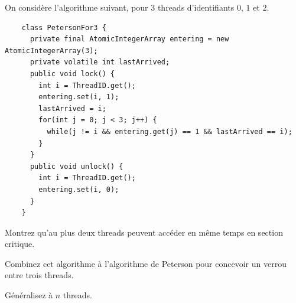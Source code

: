 
\begingroup

\begin{exercice}
  \label{exo:locks/filter}

  On considère l'algorithme suivant, pour $3$ threads d'identifiants $0$, $1$ et $2$. 

  \begin{lstlisting}
    class PetersonFor3 {
      private final AtomicIntegerArray entering = new AtomicIntegerArray(3);
      private volatile int lastArrived;
      public void lock() {
        int i = ThreadID.get();
        entering.set(i, 1);
        lastArrived = i;
        for(int j = 0; j < 3; j++) {
          while(j != i && entering.get(j) == 1 && lastArrived == i);
        }
      }
      public void unlock() {
        int i = ThreadID.get();
        entering.set(i, 0);
      }
    }
  \end{lstlisting}

  \begin{questions}
  \item Montrez qu'au plus deux threads peuvent accéder en même temps en section critique.
  \item Combinez cet algorithme à l'algorithme de Peterson pour concevoir un verrou entre trois threads.
  \item Généralisez à $n$ threads.
  \end{questions}
  
\end{exercice}

\endgroup
\endinput
